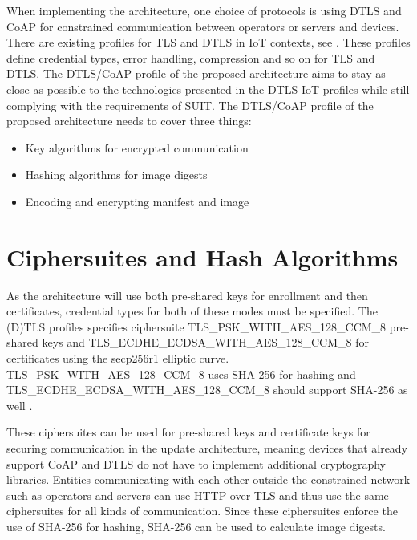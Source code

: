 \documentclass[0-thesis.tex]{subfiles}
\begin{document}
\label{chap:profiles}

When implementing the architecture, one choice of protocols is using DTLS and CoAP for
constrained communication between operators or servers and devices. There are existing
profiles for TLS and DTLS in IoT contexts, see \parencite{rfc7925}. These profiles define
credential types, error handling, compression and so on for TLS and DTLS. The DTLS/CoAP
profile of the proposed architecture aims to stay as close as possible to the technologies
presented in the DTLS IoT profiles while still complying with the requirements of SUIT.
The DTLS/CoAP profile of the proposed architecture needs to cover three things:

\begin{itemize}
    \item Key algorithms for encrypted communication
    \item Hashing algorithms for image digests
    \item Encoding and encrypting manifest and image
\end{itemize}


\section{Ciphersuites and Hash Algorithms}
\label{sec:ciphersuites-hash}
As the architecture will use both pre-shared keys for enrollment and then certificates,
credential types for both of these modes must be specified. The (D)TLS profiles specifies
ciphersuite TLS\_PSK\_WITH\_AES\_128\_CCM\_8{} pre-shared keys and
TLS\_ECDHE\_ECDSA\_WITH\_AES\_128\_CCM\_8{} for certificates using the secp256r1 elliptic
curve. TLS\_PSK\_WITH\_AES\_128\_CCM\_8{} uses SHA-256 for hashing and
TLS\_ECDHE\_ECDSA\_WITH\_AES\_128\_CCM\_8{} should support SHA-256 as well
\parencite{rfc7251}. 

These ciphersuites can be used for pre-shared keys and certificate keys for securing
communication in the update architecture, meaning devices that already support CoAP and
DTLS do not have to implement additional cryptography libraries. Entities communicating
with each other outside the constrained network such as operators and servers can use HTTP
over TLS and thus use the same ciphersuites for all kinds of communication. Since these
ciphersuites enforce the use of SHA-256 for hashing, SHA-256 can be used to calculate
image digests.
\end{document}
